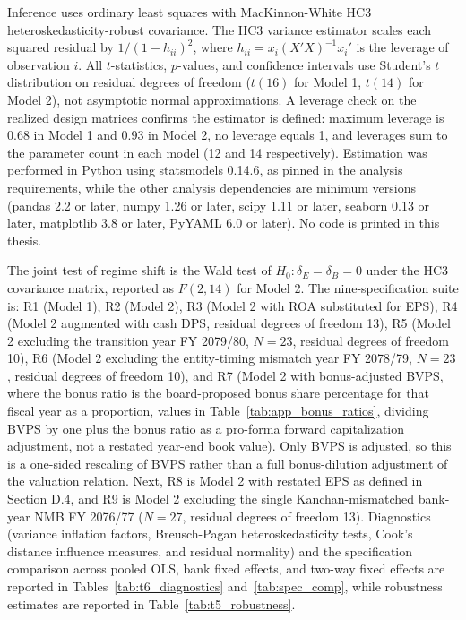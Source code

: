 Inference uses ordinary least squares with MacKinnon-White HC3 heteroskedas\-ticity-robust covariance. The HC3 variance estimator scales each squared residual by $1 / (1 - h_{ii})^2$, where $h_{ii} = x_i (X'X)^{-1} x_i'$ is the leverage of observation $i$. All $t$-statistics, $p$-values, and confidence intervals use Student's $t$ distribution on residual degrees of freedom ($t(16)$ for Model 1, $t(14)$ for Model 2), not asymptotic normal approximations. A leverage check on the realized design matrices confirms the estimator is defined: maximum leverage is 0.68 in Model 1 and 0.93 in Model 2, no leverage equals 1, and leverages sum to the parameter count in each model (12 and 14 respectively). Estimation was performed in Python using statsmodels 0.14.6, as pinned in the analysis requirements, while the other analysis dependencies are minimum versions (pandas 2.2 or later, numpy 1.26 or later, scipy 1.11 or later, seaborn 0.13 or later, matplotlib 3.8 or later, PyYAML 6.0 or later). No code is printed in this thesis.

The joint test of regime shift is the Wald test of $H_0: \delta_E = \delta_B = 0$ under the HC3 covariance matrix, reported as $F(2, 14)$ for Model 2. The nine-specification suite is: R1 (Model 1), R2 (Model 2), R3 (Model 2 with ROA substituted for EPS), R4 (Model 2 augmented with cash DPS, residual degrees of freedom 13), R5 (Model 2 excluding the transition year FY 2079/80, $N = 23$, residual degrees of freedom 10), R6 (Model 2 excluding the entity-timing mismatch year FY 2078/79, $N = 23$, residual degrees of freedom 10), and R7 (Model 2 with bonus-adjusted BVPS, where the bonus ratio is the board-proposed bonus share percentage for that fiscal year as a proportion, values in Table~\ref{tab:app_bonus_ratios}, dividing BVPS by one plus the bonus ratio as a pro-forma forward capitalization adjustment, not a restated year-end book value). Only BVPS is adjusted, so this is a one-sided rescaling of BVPS rather than a full bonus-dilution adjustment of the valuation relation. Next, R8 is Model 2 with restated EPS as defined in Section D.4, and R9 is Model 2 excluding the single Kanchan-mismatched bank-year NMB FY 2076/77 ($N = 27$, residual degrees of freedom 13). Diagnostics (variance inflation factors, Breusch-Pagan heteroskedasticity tests, Cook's distance influence measures, and residual normality) and the specification comparison across pooled OLS, bank fixed effects, and two-way fixed effects are reported in Tables~\ref{tab:t6_diagnostics} and~\ref{tab:spec_comp}, while robustness estimates are reported in Table~\ref{tab:t5_robustness}.


